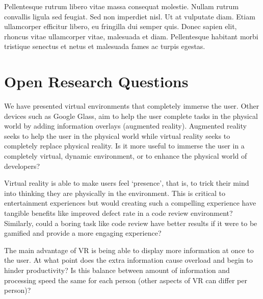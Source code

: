 \documentclass{acm_proc_article-sp}
\begin{document}
Pellentesque rutrum libero vitae massa consequat molestie. Nullam rutrum convallis ligula sed feugiat. Sed non imperdiet nisl. Ut at vulputate diam. Etiam ullamcorper efficitur libero, eu fringilla dui semper quis. Donec sapien elit, rhoncus vitae ullamcorper vitae, malesuada et diam. Pellentesque habitant morbi tristique senectus et netus et malesuada fames ac turpis egestas. 



\section{Open Research Questions}
We have presented virtual environments that completely immerse the user. Other devices such as Google Glass, aim to help the user complete tasks in the physical world by adding information overlays (augmented reality). Augmented reality seeks to help the user in the physical world while virtual reality seeks to completely replace physical reality. 
Is it more useful to immerse the user in a completely virtual, dynamic environment, or to enhance the physical world of developers?
  
Virtual reality is able to make users feel `presence', that is, to trick their mind into thinking they are physically in the environment. This is critical to entertainment experiences but would creating such a compelling experience have tangible benefits like improved defect rate in a code review environment? Similarly, could a boring task like code review have better results if it were to be gamified and provide a more engaging experience? 

The main advantage of VR is being able to display more information at once to the user.  At what point does the extra information cause overload and begin to hinder productivity?  Is this balance between amount of information and processing speed the same for each person (other aspects of VR can differ per person)?
\end{document}
